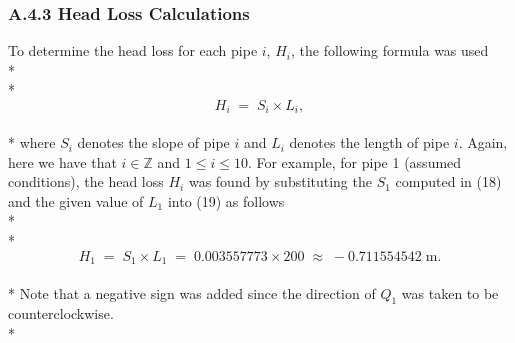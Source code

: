 \documentclass[]{article}
\begin{document}
\subsubsection{A.4.3 Head Loss Calculations}
To determine the head loss for each pipe $i$, $H_i$, the following formula was used \\* \\* 
\begin{equation}
H_i \; = \; S_i \times L_i,
\end{equation} \\* 
where $S_i$ denotes the slope of pipe $i$ and $L_i$ denotes the length of pipe $i$. Again, here we have that $i \in \mathbb{Z}$ and $1 \leq i \leq 10$. For example, for pipe 1 (assumed conditions), the head loss $H_i$ was found by substituting the $S_1$ computed in (18) and the given value of $L_1$ into (19) as follows \\* \\* 
\begin{equation}
H_1 \; = \; S_1 \times L_1 \; = \; 0.003557773 \times 200 \; \approx \; -0.711554542 \; \text{m}. 
\end{equation} \\* 
Note that a negative sign was added since the direction of $Q_1$ was taken to be counterclockwise. \\* 
\end{document}
